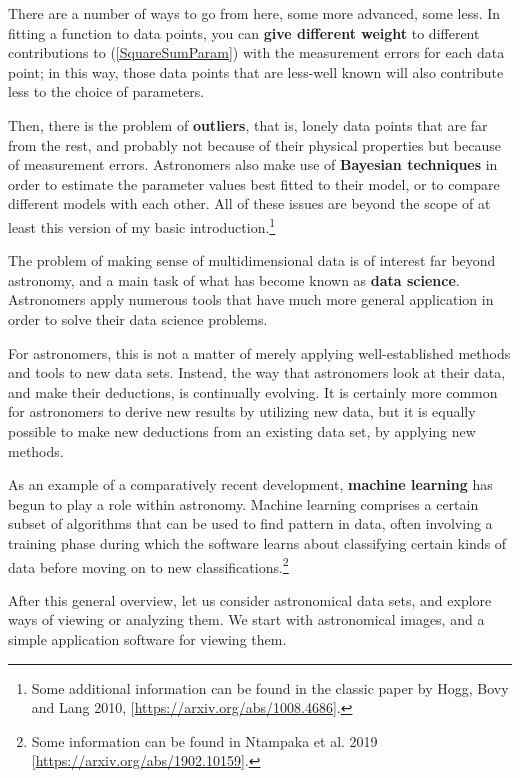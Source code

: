 \documentclass[twocolumn,apj]{openjournal}
\begin{document}
There are a number of ways to go from here, some more advanced, some less. In fitting a function to data points, you can {\bf give different weight} to different contributions to (\ref{SquareSumParam}) with the measurement errors for each data point; in this way, those data points that are less-well known will also contribute less to the choice of parameters. 

Then, there is the problem of {\bf outliers}, that is, lonely data points that are far from the rest, and probably not because of their physical properties but because of measurement errors. Astronomers also make use of {\bf Bayesian techniques} in order to estimate the parameter values best fitted to their model, or to compare different models with each other. All of these issues are beyond the scope of at least this version of my basic introduction.\footnote{Some additional information can be found in the classic paper by Hogg, Bovy and Lang 2010, [\href{https://arxiv.org/abs/1008.4686}{https://arxiv.org/abs/1008.4686}].} 

The problem of making sense of multidimensional data is of interest far beyond astronomy, and a main task of what has become known as {\bf data science}. Astronomers apply numerous tools that have much more general application in order to solve their data science problems. 

For astronomers, this is not a matter of merely applying well-established methods and tools to new data sets. Instead, the way that astronomers look at their data, and make their deductions, is continually evolving. It is certainly more common for astronomers to derive new results by utilizing new data, but it is equally possible to make new deductions from an existing data set, by applying new methods.

As an example of a comparatively recent development, {\bf machine learning} has begun to play a role within astronomy. Machine learning comprises a certain subset of algorithms that can be used to find pattern in data, often involving a training phase during which the software learns about classifying certain kinds of data before moving on to new classifications.\footnote{Some information can be found in Ntampaka et al. 2019 [\href{https://arxiv.org/abs/1902.10159}{https://arxiv.org/abs/1902.10159}]. }

After this general overview, let us consider astronomical data sets, and explore ways of viewing or analyzing them. We start with astronomical images, and a simple application software for viewing them.
\end{document}
